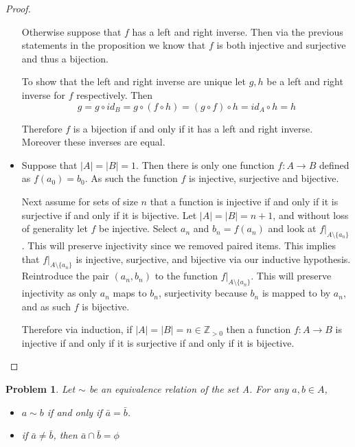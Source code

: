 \documentclass[10pt]{article}
\newcommand{\sk}{\vskip 10mm}
\newcommand{\bb}[1]{\mathbb{#1}}
\newcommand{\ra}{\rightarrow}
\theoremstyle{plain}
\newtheorem{problem}{Problem}
\theoremstyle{remark}
\begin{document}
\begin{proof}
\begin{itemize}
    Otherwise suppose that $f$ has a left and right inverse. Then via the previous
    statements in the proposition we know that $f$ is both injective and surjective and
    thus a bijection.

    To show that the left and right inverse are unique let $g,h$ be a left and right
    inverse for $f$ respectively. Then
    \[g=g\circ id_B=g\circ(f\circ h)=(g\circ f)\circ h=id_A\circ h=h\]

    Therefore $f$ is a bijection if and only if it has a left and right inverse.
    Moreover these inverses are equal.
  \item[d)] Suppose that $|A|=|B|=1$. Then there is only one function $f:A\ra B$
    defined as $f(a_0)=b_0$. As such the function $f$ is injective, surjective and
    bijective.

    Next assume for sets of size $n$ that a function is injective if and only if it
    is surjective if and only if it is bijective. Let $|A|=|B|=n+1$, and 
    without loss of generality let $f$ be injective. Select $a_n$ and $b_n=f(a_n)$
    and look at $f|_{A\setminus \{a_n\}}$. This will preserve injectivity since we removed
    paired items. This implies that $f|_{A\setminus\{a_n\}}$ is injective, surjective, and
    bijective via our inductive hypothesis. Reintroduce the pair $(a_n,b_n)$ to the
    function $f|_{A\setminus \{a_n\}}$. This will preserve injectivity as only $a_n$ maps
    to $b_n$, surjectivity because $b_n$ is mapped to by $a_n$, and as such $f$ is
    bijective.

    Therefore via induction, if $|A|=|B|=n\in \bb{Z}_{>0}$ then a function $f:A\ra B$ is
    injective if and only if it is surjective if and only if it is bijective.
  \end{itemize}
\end{proof}

\sk

\begin{problem}
  Let $\sim$ be an equivalence relation of the set A. For any $a,b\in A$,
  \begin{itemize}
  \item[a)] $a\sim b$ if and only if $\bar{a}=\bar{b}$.
  \item[b)] if $\bar{a}\neq \bar{b}$, then $\bar{a}\cap\bar{b}=\phi$
  \end{itemize}
\end{problem}
\end{document}
